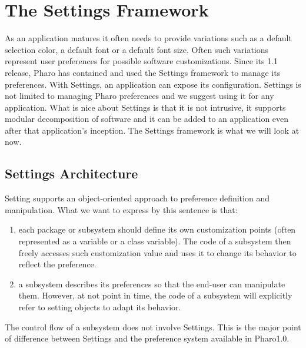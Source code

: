 \documentclass[a4paper,10pt,twoside]{book}
\begin{document}
\fi
\sloppy
\newcommand{\setbrowser}{\textit{Settings Browser}\xspace}

\chapter{The Settings Framework}

\chapterauthor{\authoralain{}}

As an application matures it often needs to provide variations such as
a default selection color, a default font or a default font size.
Often such variations represent user  preferences 
for possible software customizations. Since its 1.1 release, Pharo has contained and used
the Settings framework to manage its preferences. With Settings, an
application can expose its configuration. Settings is not limited to
managing Pharo preferences and we suggest using it for any
application. What is nice about Settings is that it is not intrusive,
it supports modular decomposition of software and it can be added to
an application even after that application's inception. The Settings
framework is what we will look at now.

\section{Settings Architecture}

Setting supports an object-oriented approach to  preference definition and manipulation. What we want to express by this sentence is that:
\begin{enumerate}
\item each package or subsystem should define its own customization points (often represented as a variable or a class variable). The code of a subsystem then freely accesses such customization value and uses it to change its behavior to reflect the preference.
\item a subsystem describes its preferences so that the end-user can manipulate them. However, at not point in time, the code of a subsystem will explicitly refer to setting objects to adapt its behavior. 
\end{enumerate}

The control flow of a subsystem does not involve Settings. This is the major point of difference between Settings and the preference system available in Pharo1.0.
\end{document}
